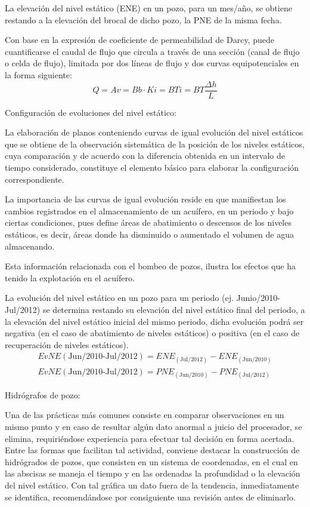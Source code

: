 La elevación del nivel estático (ENE) en un pozo, para un mes/año, se obtiene restando a la elevación del brocal de dicho pozo, la PNE de la misma fecha.

Con base en la expresión de coeficiente de permeabilidad de Darcy, puede cuantificarse el caudal de flujo que circula a través de una sección (canal de flujo o celda de flujo), limitada por dos líneas de flujo y dos curvas equipotenciales en la forma siguiente:
\begin{equation}
    Q =Av = Bb \cdot Ki= BTi = BT \frac{\Delta h}{L}
\end{equation}

Configuración de evoluciones del nivel estático:

La elaboración de planos conteniendo curvas de igual evolución del nivel estáticos que se obtiene de la observación sistemática de la posición de los niveles estáticos, cuya comparación y de acuerdo con la diferencia obtenida en un intervalo de tiempo considerado, constituye el elemento básico para elaborar la configuración correspondiente.

La importancia de las curvas de igual evolución reside en que manifiestan los cambios registrados en el almacenamiento de un acuífero, en un periodo y bajo ciertas condiciones, pues define áreas de abatimiento o descensos de los niveles estáticos, es decir, áreas donde ha disminuido o aumentado el volumen de agua almacenando.

Esta información relacionada con el bombeo de pozos, ilustra los efectos que ha tenido la explotación en el acuífero.

La evolución del nivel estático en un pozo para un periodo (ej. Junio/2010-Jul/2012) se determina restando su elevación del nivel estático final del periodo, a la elevación del nivel estático inicial del mismo periodo, dicha evolución podrá ser negativa (en el caso de abatimiento de niveles estáticos) o positiva (en el caso de recuperación de niveles estáticos).
\begin{align*}
    EvNE(\text{Jun/2010-Jul/2012}) = ENE_{(\text{Jul/2012})}- ENE_{(\text{Jun/2010})}\\
    EvNE(\text{Jun/2010-Jul/2012}) = PNE_{(\text{Jun/2010})}- PNE_{(\text{Jul/2012})}
\end{align*}

Hidrógrafos de pozo:

Una de las prácticas más comunes consiste en comparar observaciones en un mismo punto y en caso de resultar algún dato anormal a juicio del procesador, se elimina, requiriéndose experiencia para efectuar tal decisión en forma acertada. Entre las formas que facilitan tal actividad, conviene destacar la construcción de hidrógrados de pozos, que consisten en un sistema de coordenadas, en el cual en las abscisas se maneja el tiempo y en las ordenadas la profundidad o la elevación del nivel estático. Con tal gráfica un dato fuera de la tendencia, inmediatamente se identifica, recomendándose por consiguiente una revisión antes de eliminarlo.

